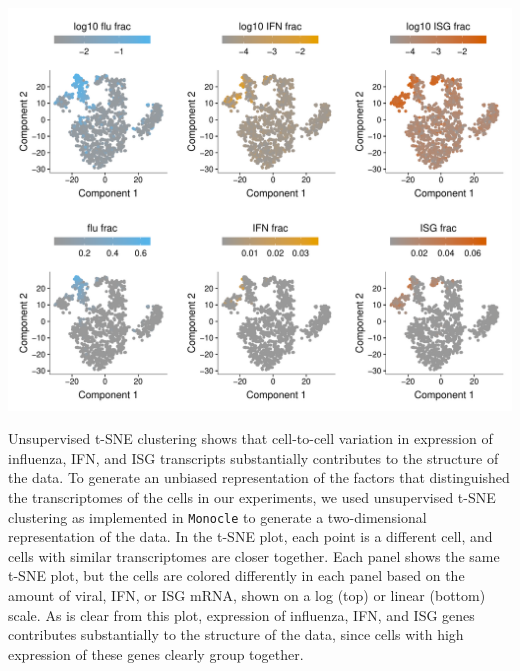\documentclass[]{asm-article}
\begin{document}
\begin{suppfig}
\includegraphics[width=\textwidth]{figures/single_cell_figures/p_tsne.pdf}
\caption{
Unsupervised t-SNE clustering shows that cell-to-cell variation in expression of influenza, IFN, and ISG transcripts substantially contributes to the structure of the data.
To generate an unbiased representation of the factors that distinguished the transcriptomes of the cells in our experiments, we used unsupervised t-SNE clustering as implemented in \texttt{Monocle} to generate a two-dimensional representation of the data.
In the t-SNE plot, each point is a different cell, and cells with similar transcriptomes are closer together.
Each panel shows the same t-SNE plot, but the cells are colored differently in each panel based on the amount of viral, IFN, or ISG mRNA, shown on a log (top) or linear (bottom) scale.
As is clear from this plot, expression of influenza, IFN, and ISG genes contributes substantially to the structure of the data, since cells with high expression of these genes clearly group together.
}
\label{suppfig:tSNE}
\end{suppfig}
\end{document}
